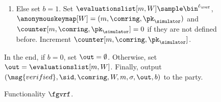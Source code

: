 \begin{figure}
\begin{tcolorbox}
{\begin{description}
\begin{enumerate}[label={{Cond.-} }{{\arabic*}}, start = 1]
					\item Else set $ b = 1 $. Set $ \evaluationslist[m, W]\sample \bin^{\ell_\rvrf}$, $ \anonymouskeymap[W]  = (m, \comring, \pk_\simulator)$ and $ \counter[m, \comring, \pk_\simulator] = 0 $ if they are not defined before. Increment $ \counter[m, \comring, \pk_\simulator]  $. \label{cond:advsignature}
				\end{enumerate}
				In the end, if $ b = 0 $, set $ \out = \emptyset $. Otherwise,  set $ \out = \evaluationslist[m, W]$. 		Finally, output $(\msg{verified}, \sid, \comring,W, m, \sigma, \out, b)$ to the party.
				
			\end{description}
		
			
		}
	\end{tcolorbox}
	\caption{Functionality $\fgvrf$.\label{f:gvrf}}
\end{figure}
	


